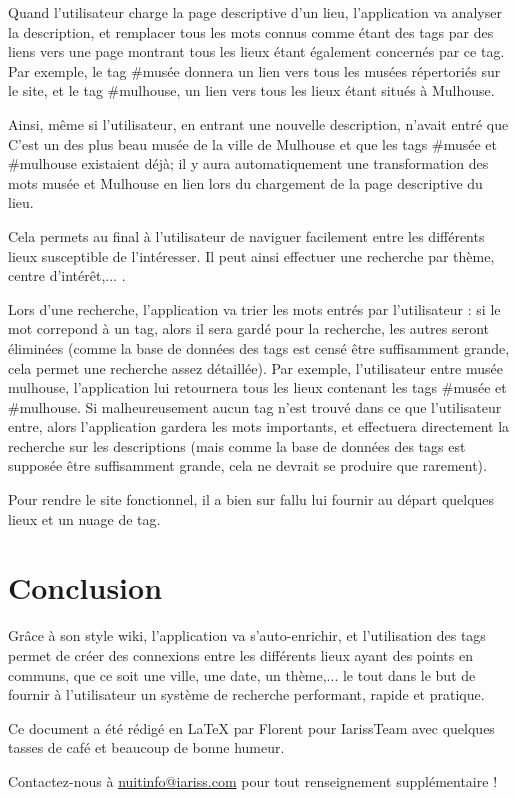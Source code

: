 \documentclass[12pt, a4paper]{article}
\newcommand{\espace}{\vspace{.8cm}}
\newcommand{\authors}{Florent}
\begin{document}
Quand l'utilisateur charge la page descriptive d'un lieu, l'application va analyser la description, et remplacer tous les mots connus comme étant des tags par des liens vers une page montrant tous les lieux étant également concernés par ce tag. Par exemple, le tag \#musée donnera un lien vers tous les musées répertoriés sur le site, et le tag \#mulhouse, un lien vers tous les lieux étant situés à Mulhouse.

Ainsi, même si l'utilisateur, en entrant une nouvelle description, n'avait entré que \og{}C'est un des plus beau musée de la ville de Mulhouse\fg{} et que les tags \#musée et \#mulhouse existaient déjà; il y aura automatiquement une transformation des mots \og{}musée\fg{} et \og{}Mulhouse\fg{} en lien lors du chargement de la page descriptive du lieu.

Cela permets au final à l'utilisateur de naviguer facilement entre les différents lieux susceptible de l'intéresser. Il peut ainsi effectuer une recherche par thème, centre d'intérêt,... .

\espace{}
Lors d'une recherche, l'application va trier les mots entrés par l'utilisateur :  si le mot correpond à un tag, alors il sera gardé pour la recherche, les autres seront éliminées (comme la base de données des tags est censé être suffisamment grande, cela permet une recherche assez détaillée). Par exemple, l'utilisateur entre \og{}musée mulhouse\fg{}, l'application lui retournera tous les lieux contenant les tags \#musée et \#mulhouse. Si malheureusement aucun tag n'est trouvé dans ce que l'utilisateur entre, alors l'application gardera les mots importants, et effectuera directement la recherche sur les descriptions (mais comme la base de données des tags est supposée être suffisamment grande, cela ne devrait se produire que rarement).

\espace{}
Pour rendre le site fonctionnel, il a bien sur fallu lui fournir au départ quelques lieux et un nuage de tag.

\espace{}
\section{Conclusion}
Grâce à son style wiki, l'application va s'auto-enrichir, et l'utilisation des tags permet de créer des connexions entre les différents lieux ayant des points en communs, que ce soit une ville, une date, un thème,... le tout dans le but de fournir à l'utilisateur un système de recherche performant, rapide et pratique.


\espace\vfill{}
Ce document a été rédigé en \LaTeX{} par \authors{} pour IarissTeam avec quelques tasses de café et beaucoup de bonne humeur.

Contactez-nous à \href{mailto:nuitinfo@iariss.com}{nuitinfo@iariss.com} pour tout renseignement supplémentaire !
\end{document}
